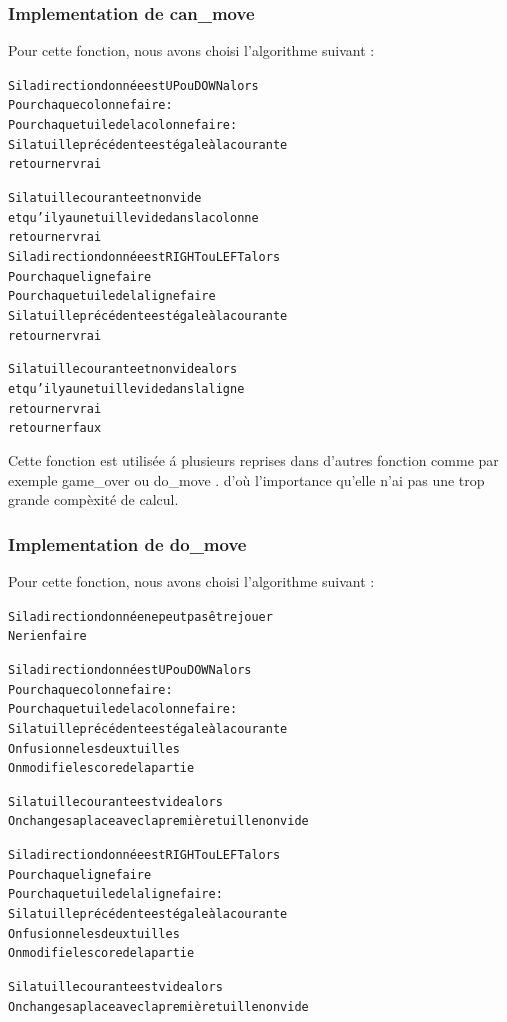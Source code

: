 \documentclass[12pt]{article}
\begin{document}
\subsubsection{Implementation de \og can\_move \fg{}}
Pour cette fonction, nous avons choisi l'algorithme suivant :

\begin{alltt}
{\color{gray}
Si la direction donn\'ee est \og UP \fg{} ou \og DOWN \fg{} alors
    Pour chaque colonne faire :
        Pour chaque tuile de la colonne faire :
            Si la tuille pr\'ec\'edente est \'egale \`a la courante
                retourner vrai
 		
            Si la tuille courante et non vide 
                   et qu'il y a une tuille vide dans la colonne
                retourner vrai	    	
Si la direction donn\'ee est \og RIGHT \fg{} ou \og LEFT \fg{} alors
    Pour chaque ligne faire 
        Pour chaque tuile de la ligne faire
            Si la tuille pr\'ec\'edente est \'egale \`a la courante
                retourner vrai
 		
            Si la tuille courante et non vide alors
                   et qu'il y a une tuille vide dans la ligne
                retourner vrai	    	
retourner faux
}
\end{alltt}

Cette fonction est utilis\'ee \'a plusieurs reprises dans d'autres fonction
comme par exemple \og game\_over \fg{} ou \og do\_move \fg{}. d'o\`u
l'importance qu'elle n'ai pas une trop grande comp\`exit\'e de calcul.

\subsubsection{Implementation de \og do\_move \fg{}}
Pour cette fonction, nous avons choisi l'algorithme suivant :
\begin{alltt}
{\color{gray}
Si la direction donn\'ee ne peut pas \^etre jouer
    Ne rien faire
    
    
Si la direction donn\'e est \og UP \fg{} ou \og DOWN \fg{} alors
    Pour chaque colonne faire :
        Pour chaque tuile de la colonne faire :
            Si la tuille pr\'ec\'edente est \'egale \`a la courante
                On fusionne les deux tuilles
                On modifie le score de la partie
            
            Si la tuille courante est vide alors
            	On change sa place avec la premi\`ere tuille non vide
            	
Si la direction donn\'ee est \og RIGHT \fg{} ou \og LEFT \fg{} alors
    Pour chaque ligne faire 
        Pour chaque tuile de la ligne faire :
            Si la tuille pr\'ec\'edente est \'egale \`a la courante
                On fusionne les deux tuilles
                On modifie le score de la partie
            
            Si la tuille courante est vide alors
            	On change sa place avec la premi\`ere tuille non vide
}
\end{alltt}
\end{document}
